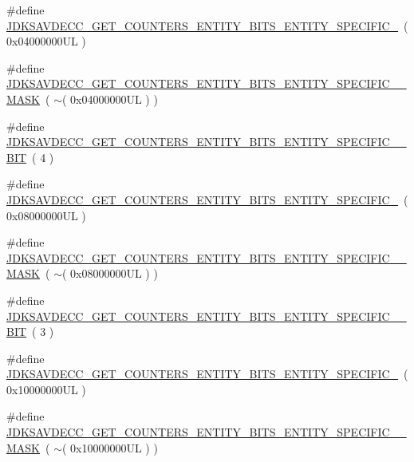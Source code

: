 \begin{DoxyCompactItemize}
\item 
\#define \hyperlink{group__get__counters__entity__bits_ga06e2f12b7a9277de2983669861dd62ae}{J\+D\+K\+S\+A\+V\+D\+E\+C\+C\+\_\+\+G\+E\+T\+\_\+\+C\+O\+U\+N\+T\+E\+R\+S\+\_\+\+E\+N\+T\+I\+T\+Y\+\_\+\+B\+I\+T\+S\+\_\+\+E\+N\+T\+I\+T\+Y\+\_\+\+S\+P\+E\+C\+I\+F\+I\+C\+\_}~( 0x04000000\+U\+L )
\item 
\#define \hyperlink{group__get__counters__entity__bits_ga98cee20852134b90dea4a42fc4ebb8e1}{J\+D\+K\+S\+A\+V\+D\+E\+C\+C\+\_\+\+G\+E\+T\+\_\+\+C\+O\+U\+N\+T\+E\+R\+S\+\_\+\+E\+N\+T\+I\+T\+Y\+\_\+\+B\+I\+T\+S\+\_\+\+E\+N\+T\+I\+T\+Y\+\_\+\+S\+P\+E\+C\+I\+F\+I\+C\+\_\+\_\+\+M\+A\+SK}~( $\sim$( 0x04000000\+U\+L ) )
\item 
\#define \hyperlink{group__get__counters__entity__bits_ga00ad2600ac1ca6b885848b8e128b8138}{J\+D\+K\+S\+A\+V\+D\+E\+C\+C\+\_\+\+G\+E\+T\+\_\+\+C\+O\+U\+N\+T\+E\+R\+S\+\_\+\+E\+N\+T\+I\+T\+Y\+\_\+\+B\+I\+T\+S\+\_\+\+E\+N\+T\+I\+T\+Y\+\_\+\+S\+P\+E\+C\+I\+F\+I\+C\+\_\+\_\+\+B\+IT}~( 4 )
\item 
\#define \hyperlink{group__get__counters__entity__bits_ga3c6c1ad68eca57ffe46b4d0b08f99f21}{J\+D\+K\+S\+A\+V\+D\+E\+C\+C\+\_\+\+G\+E\+T\+\_\+\+C\+O\+U\+N\+T\+E\+R\+S\+\_\+\+E\+N\+T\+I\+T\+Y\+\_\+\+B\+I\+T\+S\+\_\+\+E\+N\+T\+I\+T\+Y\+\_\+\+S\+P\+E\+C\+I\+F\+I\+C\+\_}~( 0x08000000\+U\+L )
\item 
\#define \hyperlink{group__get__counters__entity__bits_ga2ba49ff7d1973d24ffc6a0467c89c4c3}{J\+D\+K\+S\+A\+V\+D\+E\+C\+C\+\_\+\+G\+E\+T\+\_\+\+C\+O\+U\+N\+T\+E\+R\+S\+\_\+\+E\+N\+T\+I\+T\+Y\+\_\+\+B\+I\+T\+S\+\_\+\+E\+N\+T\+I\+T\+Y\+\_\+\+S\+P\+E\+C\+I\+F\+I\+C\+\_\+\_\+\+M\+A\+SK}~( $\sim$( 0x08000000\+U\+L ) )
\item 
\#define \hyperlink{group__get__counters__entity__bits_ga53578a5eb782a4c4691114081521864c}{J\+D\+K\+S\+A\+V\+D\+E\+C\+C\+\_\+\+G\+E\+T\+\_\+\+C\+O\+U\+N\+T\+E\+R\+S\+\_\+\+E\+N\+T\+I\+T\+Y\+\_\+\+B\+I\+T\+S\+\_\+\+E\+N\+T\+I\+T\+Y\+\_\+\+S\+P\+E\+C\+I\+F\+I\+C\+\_\+\_\+\+B\+IT}~( 3 )
\item 
\#define \hyperlink{group__get__counters__entity__bits_ga9ac9395df8bc53ed9d0663c568ea225c}{J\+D\+K\+S\+A\+V\+D\+E\+C\+C\+\_\+\+G\+E\+T\+\_\+\+C\+O\+U\+N\+T\+E\+R\+S\+\_\+\+E\+N\+T\+I\+T\+Y\+\_\+\+B\+I\+T\+S\+\_\+\+E\+N\+T\+I\+T\+Y\+\_\+\+S\+P\+E\+C\+I\+F\+I\+C\+\_}~( 0x10000000\+U\+L )
\item 
\#define \hyperlink{group__get__counters__entity__bits_ga34874414b1ed0b7a7af578aa53ce1f88}{J\+D\+K\+S\+A\+V\+D\+E\+C\+C\+\_\+\+G\+E\+T\+\_\+\+C\+O\+U\+N\+T\+E\+R\+S\+\_\+\+E\+N\+T\+I\+T\+Y\+\_\+\+B\+I\+T\+S\+\_\+\+E\+N\+T\+I\+T\+Y\+\_\+\+S\+P\+E\+C\+I\+F\+I\+C\+\_\+\_\+\+M\+A\+SK}~( $\sim$( 0x10000000\+U\+L ) )

\end{DoxyCompactItemize}
